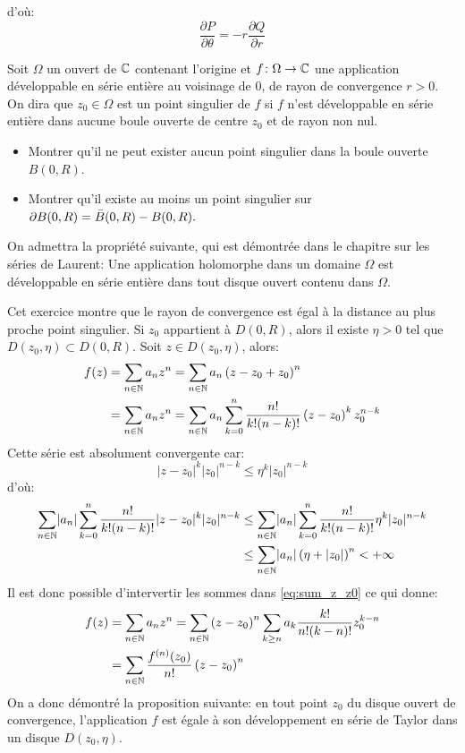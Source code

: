 \documentclass[a4paper, 12pt]{amsart}
\begin{document}
d'où:
\[
\frac{\partial P}{\partial \theta} = -r \frac{\partial Q}{\partial r}
\]
\begin{fex}
    Soit $\Omega$ un ouvert de $\mathbb{C}$ contenant l'origine et $f \colon \Omega \to \mathbb{C}$ une application développable en
    série entière au voisinage de $0$, de rayon de convergence $r > 0$. On dira que $z_0 \in \Omega$ est un point singulier de $f$ si $f$ n'est développable en série entière dans aucune boule ouverte de centre $z_0$ et de rayon non nul.
    \begin{itemize}
        \item Montrer qu'il ne peut exister aucun point singulier dans la boule ouverte $B(0,R).$
        \item Montrer qu'il existe au moins un point singulier sur $\partial B(0,R) = \Bar{B}(0,R)-B(0,R).$
    \end{itemize}
    On admettra la propriété suivante, qui est démontrée dans le chapitre sur les séries de Laurent: Une application holomorphe dans un domaine $\Omega$ est développable en série entière dans tout disque ouvert contenu dans $\Omega.$
\end{fex}
Cet exercice montre que le rayon de convergence est égal à la distance au plus proche point singulier. 
Si $z_0$ appartient à $D(0,R)$, alors il existe $\eta > 0$ tel que $D(z_0,\eta) \subset D(0,R).$ Soit $z \in D(z_0,\eta)$, alors:
\begin{equation}
\label{eq:sum_z_z0}
\begin{split}
f(z) & = \sum_{n\in \mathbb{N}} a_n z^n = \sum_{n \in \mathbb{N}} a_n \left(
z-z_0 + z_0
\right)^n \\
& = \sum_{n\in \mathbb{N}} a_n z^n = \sum_{n \in \mathbb{N}} a_n \sum_{k=0}^n
\frac{n!}{k!(n-k)!} \left( z-z_0 \right)^k z_0^{n-k}
\end{split}
\end{equation}
Cette série est absolument convergente car:
\[
\lvert z-z_0 \rvert ^k \lvert z_0 \rvert^{n-k} \leq \eta^k \lvert z_0 \rvert^{n-k}
\]
d'où:
\[
\begin{split}
\sum_{n \in \mathbb{N}} \lvert  a_n \rvert \sum_{k=0}^n
\frac{n!}{k!(n-k)!} \lvert z-z_0 \rvert^k \lvert z_0\rvert ^{n-k} 
& \leq \sum_{n \in \mathbb{N}} \lvert  a_n \rvert \sum_{k=0}^n
\frac{n!}{k!(n-k)!} \eta^k \lvert z_0 \rvert^{n-k}\\
& \leq \sum_{n \in \mathbb{N}} \lvert  a_n \rvert \left( \eta + \lvert z_0 \rvert \right)^n < +\infty
\end{split}
\]
Il est donc possible d'intervertir les sommes dans \ref{eq:sum_z_z0} ce qui donne:
\begin{equation}
\begin{split}
 f(z) & = \sum_{n\in \mathbb{N}} a_n z^n = \sum_{n \in \mathbb{N}} \left(z-z_0\right)^n \sum_{k \geq n} a_k \frac{k!}{n! (k-n)!}z_0^{k-n} \\ 
  & = \sum_{n \in \mathbb{N}} \frac{f^{(n)}(z_0)}{n!} \left(z-z_0\right)^n
  \end{split}
\end{equation}
On a donc démontré la proposition suivante: en tout point $z_0$ du disque ouvert de convergence, l'application $f$ est égale à son développement en série de Taylor dans un disque $D(z_0,\eta).$
\end{document}

